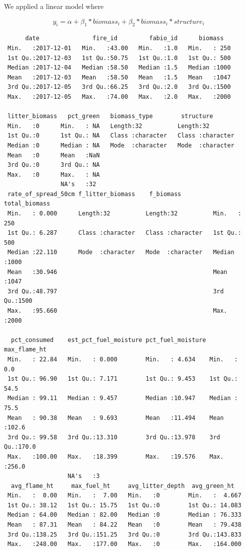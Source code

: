 \documentclass[11pt,a4paper]{article}
\begin{document}
We applied a linear model where

\[
y_{i} = \alpha + \beta_{1}*biomass_{i} + \beta_{2}*biomass_{i}*structure_{i}
\]

\begin{verbatim}
      date               fire_id         fabio_id      biomass    
 Min.   :2017-12-01   Min.   :43.00   Min.   :1.0   Min.   : 250  
 1st Qu.:2017-12-03   1st Qu.:50.75   1st Qu.:1.0   1st Qu.: 500  
 Median :2017-12-04   Median :58.50   Median :1.5   Median :1000  
 Mean   :2017-12-03   Mean   :58.50   Mean   :1.5   Mean   :1047  
 3rd Qu.:2017-12-05   3rd Qu.:66.25   3rd Qu.:2.0   3rd Qu.:1500  
 Max.   :2017-12-05   Max.   :74.00   Max.   :2.0   Max.   :2000  
                                                                  
 litter_biomass   pct_green   biomass_type        structure        
 Min.   :0      Min.   : NA   Length:32          Length:32         
 1st Qu.:0      1st Qu.: NA   Class :character   Class :character  
 Median :0      Median : NA   Mode  :character   Mode  :character  
 Mean   :0      Mean   :NaN                                        
 3rd Qu.:0      3rd Qu.: NA                                        
 Max.   :0      Max.   : NA                                        
                NA's   :32                                         
 rate_of_spread_50cm f_litter_biomass    f_biomass         total_biomass 
 Min.   : 0.000      Length:32          Length:32          Min.   : 250  
 1st Qu.: 6.287      Class :character   Class :character   1st Qu.: 500  
 Median :22.110      Mode  :character   Mode  :character   Median :1000  
 Mean   :30.946                                            Mean   :1047  
 3rd Qu.:48.797                                            3rd Qu.:1500  
 Max.   :95.660                                            Max.   :2000  
                                                                         
  pct_consumed    est_pct_fuel_moisture pct_fuel_moisture  max_flame_ht  
 Min.   : 22.84   Min.   : 0.000        Min.   : 4.634    Min.   :  0.0  
 1st Qu.: 96.90   1st Qu.: 7.171        1st Qu.: 9.453    1st Qu.: 54.5  
 Median : 99.11   Median : 9.457        Median :10.947    Median : 75.5  
 Mean   : 90.38   Mean   : 9.693        Mean   :11.494    Mean   :102.6  
 3rd Qu.: 99.58   3rd Qu.:13.310        3rd Qu.:13.978    3rd Qu.:170.0  
 Max.   :100.00   Max.   :18.399        Max.   :19.576    Max.   :256.0  
                  NA's   :3                                              
  avg_flame_ht     max_fuel_ht     avg_litter_depth  avg_green_ht    
 Min.   :  0.00   Min.   :  7.00   Min.   :0        Min.   :  4.667  
 1st Qu.: 38.12   1st Qu.: 15.75   1st Qu.:0        1st Qu.: 14.083  
 Median : 64.00   Median : 82.00   Median :0        Median : 76.333  
 Mean   : 87.31   Mean   : 84.22   Mean   :0        Mean   : 79.438  
 3rd Qu.:138.25   3rd Qu.:151.25   3rd Qu.:0        3rd Qu.:143.833  
 Max.   :248.00   Max.   :177.00   Max.   :0        Max.   :164.000  
                                                                     

\end{verbatim}
\end{document}
